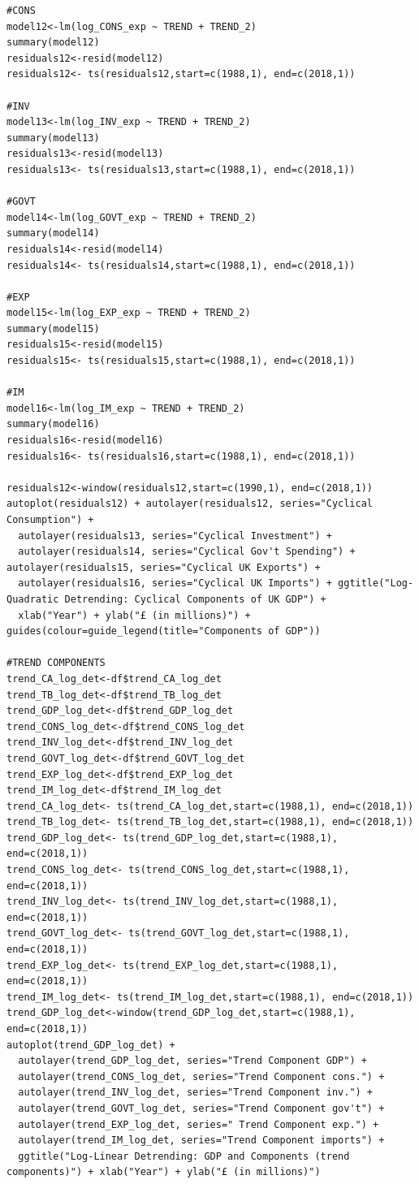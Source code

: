 \documentclass[12pt]{article}
\begin{document}
\begin{verbatim}
#CONS
model12<-lm(log_CONS_exp ~ TREND + TREND_2)
summary(model12)
residuals12<-resid(model12)
residuals12<- ts(residuals12,start=c(1988,1), end=c(2018,1))

#INV
model13<-lm(log_INV_exp ~ TREND + TREND_2)
summary(model13)
residuals13<-resid(model13)
residuals13<- ts(residuals13,start=c(1988,1), end=c(2018,1))

#GOVT
model14<-lm(log_GOVT_exp ~ TREND + TREND_2)
summary(model14)
residuals14<-resid(model14)
residuals14<- ts(residuals14,start=c(1988,1), end=c(2018,1))

#EXP
model15<-lm(log_EXP_exp ~ TREND + TREND_2)
summary(model15)
residuals15<-resid(model15)
residuals15<- ts(residuals15,start=c(1988,1), end=c(2018,1))

#IM
model16<-lm(log_IM_exp ~ TREND + TREND_2)
summary(model16)
residuals16<-resid(model16)
residuals16<- ts(residuals16,start=c(1988,1), end=c(2018,1))

residuals12<-window(residuals12,start=c(1990,1), end=c(2018,1)) 
autoplot(residuals12) + autolayer(residuals12, series="Cyclical Consumption") + 
  autolayer(residuals13, series="Cyclical Investment") +
  autolayer(residuals14, series="Cyclical Gov't Spending") + autolayer(residuals15, series="Cyclical UK Exports") +
  autolayer(residuals16, series="Cyclical UK Imports") + ggtitle("Log-Quadratic Detrending: Cyclical Components of UK GDP") + 
  xlab("Year") + ylab("£ (in millions)") + guides(colour=guide_legend(title="Components of GDP"))

#TREND COMPONENTS
trend_CA_log_det<-df$trend_CA_log_det
trend_TB_log_det<-df$trend_TB_log_det
trend_GDP_log_det<-df$trend_GDP_log_det
trend_CONS_log_det<-df$trend_CONS_log_det
trend_INV_log_det<-df$trend_INV_log_det
trend_GOVT_log_det<-df$trend_GOVT_log_det
trend_EXP_log_det<-df$trend_EXP_log_det	
trend_IM_log_det<-df$trend_IM_log_det
trend_CA_log_det<- ts(trend_CA_log_det,start=c(1988,1), end=c(2018,1))
trend_TB_log_det<- ts(trend_TB_log_det,start=c(1988,1), end=c(2018,1))
trend_GDP_log_det<- ts(trend_GDP_log_det,start=c(1988,1), end=c(2018,1))
trend_CONS_log_det<- ts(trend_CONS_log_det,start=c(1988,1), end=c(2018,1))
trend_INV_log_det<- ts(trend_INV_log_det,start=c(1988,1), end=c(2018,1))
trend_GOVT_log_det<- ts(trend_GOVT_log_det,start=c(1988,1), end=c(2018,1))
trend_EXP_log_det<- ts(trend_EXP_log_det,start=c(1988,1), end=c(2018,1))
trend_IM_log_det<- ts(trend_IM_log_det,start=c(1988,1), end=c(2018,1))
trend_GDP_log_det<-window(trend_GDP_log_det,start=c(1988,1), end=c(2018,1)) 
autoplot(trend_GDP_log_det) +
  autolayer(trend_GDP_log_det, series="Trend Component GDP") +
  autolayer(trend_CONS_log_det, series="Trend Component cons.") +
  autolayer(trend_INV_log_det, series="Trend Component inv.") +
  autolayer(trend_GOVT_log_det, series="Trend Component gov't") +
  autolayer(trend_EXP_log_det, series=" Trend Component exp.") +
  autolayer(trend_IM_log_det, series="Trend Component imports") +
  ggtitle("Log-Linear Detrending: GDP and Components (trend components)") + xlab("Year") + ylab("£ (in millions)")


\end{verbatim}
\end{document}
